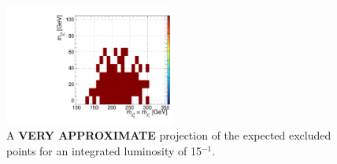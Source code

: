 \clearpage

\begin{figure}[!ht]
\begin{center}
\includegraphics[width=0.5\textwidth]{plots/wzsms_expected_15fb.pdf}
\caption{ A {\bf VERY APPROXIMATE} projection of the expected excluded points for an integrated luminosity of 15$^{-1}$. 
\label{fig:results_15fb}}
\end{center}
\end{figure}

